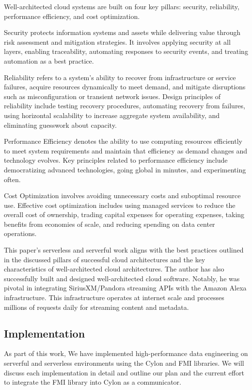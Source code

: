 Well-architected cloud systems are built on four key pillars: security, reliability, performance efficiency, and cost optimization\cite{aws_well_architected_framework}.

Security protects information systems and assets while delivering value through risk assessment and mitigation strategies. It involves applying security at all layers, enabling traceability, automating responses to security events, and treating automation as a best practice\cite{aws_well_architected_framework}.

Reliability refers to a system’s ability to recover from infrastructure or service failures, acquire resources dynamically to meet demand, and mitigate disruptions such as misconfiguration or transient network issues. Design principles of reliability include testing recovery procedures, automating recovery from failures, using horizontal scalability to increase aggregate system availability, and eliminating guesswork about capacity\cite{aws_well_architected_framework}.

Performance Efficiency denotes the ability to use computing resources efficiently to meet system requirements and maintain that efficiency as demand changes and technology evolves. Key principles related to performance efficiency include democratizing advanced technologies, going global in minutes, and experimenting often\cite{aws_well_architected_framework}.

Cost Optimization involves avoiding unnecessary costs and suboptimal resource use. Effective cost optimization includes using managed services to reduce the overall cost of ownership, trading capital expenses for operating expenses, taking benefits from economies of scale, and reducing spending on data center operations\cite{aws_well_architected_framework}.

This paper's serverless and serverful work aligns with the best practices outlined in the discussed pillars of successful cloud architectures and the key characteristics of well-architected cloud architectures. The author has also successfully built and designed well-architected cloud software. Notably, he was pivotal in integrating SiriusXM/Pandora streaming APIs with the Amazon Alexa infrastructure. This infrastructure operates at internet scale and processes millions of requests daily for streaming content and metadata.

\subsection{Implementation}
As part of this work, We have implemented high-performance data engineering on serverful and serverless environments using the Cylon and FMI libraries.  We will discuss each implementation in detail and outline our plan and the current effort to integrate the FMI library into Cylon as a communicator.

